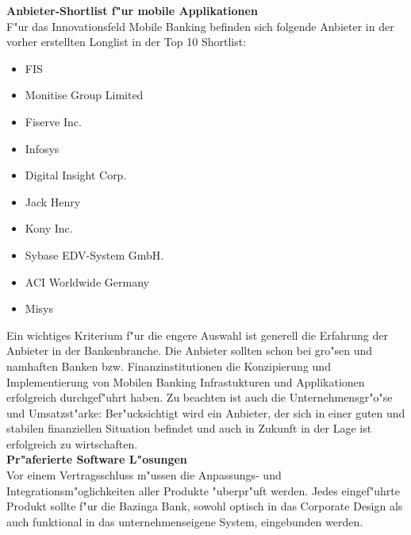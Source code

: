 \textbf{Anbieter-Shortlist f"ur mobile Applikationen}\\
F"ur das Innovationsfeld Mobile Banking befinden sich folgende Anbieter in der vorher erstellten Longlist in der Top 10 Shortlist:

\begin{itemize}
	\item FIS
	\item Monitise Group Limited
	\item Fiserve Inc.
	\item Infosys
	\item Digital Insight Corp.
	\item Jack Henry
	\item Kony Inc.
	\item Sybase EDV-System GmbH.
	\item ACI Worldwide Germany
	\item Misys
\end{itemize}

Ein wichtiges Kriterium f"ur die engere Auswahl ist generell die Erfahrung der Anbieter in der Bankenbranche. Die Anbieter sollten schon bei gro"sen und namhaften Banken bzw. Finanzinstitutionen die Konzipierung und Implementierung von Mobilen Banking Infrastukturen und Applikationen erfolgreich durchgef"uhrt haben. Zu beachten ist auch die Unternehmensgr"o"se und Umsatzst"arke: Ber"ucksichtigt wird ein Anbieter, der sich in einer guten und stabilen finanziellen Situation befindet und auch in Zukunft in der Lage ist erfolgreich zu wirtschaften.\\

\textbf{Pr"aferierte Software L"osungen}\\
Vor einem Vertragsschluss m"ussen die Anpassungs- und Integrationsm"oglichkeiten aller Produkte "uberpr"uft werden. Jedes eingef"uhrte Produkt sollte f"ur die Bazinga Bank, sowohl optisch in das Corporate Design als auch funktional in das unternehmenseigene System, eingebunden werden.

